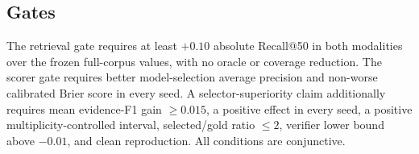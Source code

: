 \subsection{Gates}

The retrieval gate requires at least $+0.10$ absolute Recall@50 in both modalities over the frozen full-corpus values, with no oracle or coverage reduction. The scorer gate requires better model-selection average precision and non-worse calibrated Brier score in every seed. A selector-superiority claim additionally requires mean evidence-F1 gain $\geq0.015$, a positive effect in every seed, a positive multiplicity-controlled interval, selected/gold ratio $\leq2$, verifier lower bound above $-0.01$, and clean reproduction. All conditions are conjunctive.
